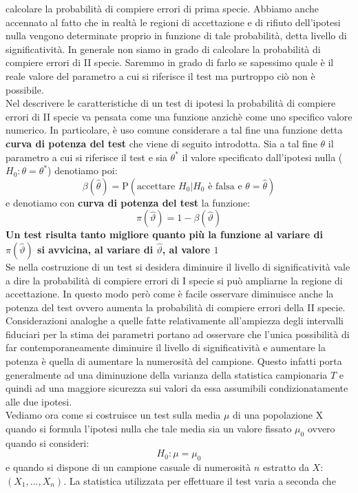 \documentclass[a4paper,12pt, oneside]{book}
\begin{document}
calcolare la probabilità di compiere errori di prima specie.
Abbiamo anche accennato al fatto che in realtà le regioni di accettazione e di rifiuto
dell’ipotesi nulla vengono determinate proprio in funzione di tale probabilità, detta
livello di significatività.
In generale non siamo in grado di calcolare la probabilità di compiere errori di II
specie.
Saremmo in grado di farlo se sapessimo quale è il reale valore del parametro a cui si
riferisce il test ma purtroppo ciò non è possibile.\\
Nel descrivere le caratteristiche di un test di ipotesi la probabilità di
compiere errori di II specie va pensata come una funzione anzichè come uno specifico
valore numerico. In particolare, è uso comune considerare a tal fine una funzione detta \textbf{curva di potenza del test} che viene di seguito introdotta. Sia a tal fine $\theta$ il parametro a cui si riferisce il test e sia $\theta^*$ il valore specificato
dall’ipotesi nulla ($H_0 : \theta = \theta^*$) denotiamo poi:
\[\beta(\hat{\theta})=\mathrm{P}\left(\text {accettare } H_{0} | H_{0} \text { è falsa e } \theta=\hat{\theta}\right)\]
e denotiamo con \textbf{curva di potenza del test} la funzione:
\[\pi(\hat{\vartheta})=1-\beta(\hat{\vartheta})\]
\textbf{Un test risulta tanto migliore quanto più la funzione
al variare di $\pi(\hat{\vartheta})$ 
si avvicina, al variare di $\hat{\vartheta}$, al valore $1$}\\
Se nella costruzione di un test si desidera diminuire il livello di significatività vale a dire la probabilità di
compiere errori di I specie si può ampliarne la regione di accettazione.
In questo modo però come è facile osservare diminuisce anche la potenza del test ovvero aumenta la
probabilità di compiere errori della II specie.
Considerazioni analoghe a quelle fatte relativamente all’ampiezza degli intervalli fiduciari per la stima dei
parametri portano ad osservare che l’unica possibilità di far contemporaneamente diminuire il livello di
significatività e aumentare la potenza è quella di aumentare la numerosità del campione.
Questo infatti porta generalmente ad una diminuzione della varianza della statistica campionaria $T$ e
quindi ad una maggiore sicurezza sui valori da essa assumibili condizionatamente alle due ipotesi.\\
Vediamo ora come si costruisce un test sulla media $\mu$ di una popolazione X quando si
formula l’ipotesi nulla che tale media sia un valore fissato $\mu_0$ ovvero quando si
consideri:
\[H_0 : \mu=\mu_0\]
e quando si dispone di un campione casuale di numerosità $n$ estratto da $X$: $(X_1,...,X_n)$. La statistica utilizzata per effettuare il test varia a seconda che
\end{document}
